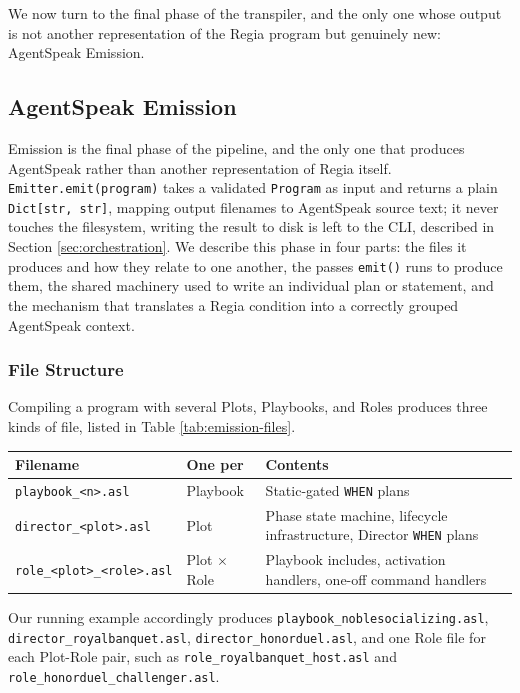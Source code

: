 We now turn to the final phase of the transpiler, and the only one whose output is not another representation of the Regia program but genuinely new: AgentSpeak Emission.

\subsection{AgentSpeak Emission}
\label{sec:emission}
Emission is the final phase of the pipeline, and the only one that produces AgentSpeak rather than another representation of Regia itself. \lstinline|Emitter.emit(program)| takes a validated \lstinline|Program| as input and returns a plain \lstinline|Dict[str, str]|, mapping output filenames to AgentSpeak source text; it never touches the filesystem, writing the result to disk is left to the CLI, described in Section \ref{sec:orchestration}. We describe this phase in four parts: the files it produces and how they relate to one another, the passes \lstinline|emit()| runs to produce them, the shared machinery used to write an individual plan or statement, and the mechanism that translates a Regia condition into a correctly grouped AgentSpeak context.

\subsubsection{File Structure}
Compiling a program with several Plots, Playbooks, and Roles produces three kinds of file, listed in Table \ref{tab:emission-files}.
\begin{center}
\begin{tabular}{|l|l|l|}
\hline
\textbf{Filename} & \textbf{One per} & \textbf{Contents} \\
\hline
\lstinline|playbook_<n>.asl| & Playbook & Static-gated \lstinline|WHEN| plans \\
\lstinline|director_<plot>.asl| & Plot & Phase state machine, lifecycle infrastructure, Director \lstinline|WHEN| plans \\
\lstinline|role_<plot>_<role>.asl| & Plot $\times$ Role & Playbook includes, activation handlers, one-off command handlers \\
\hline
\end{tabular}
\end{center}
\label{tab:emission-files}

Our running example accordingly produces \lstinline|playbook_noblesocializing.asl|, \lstinline|director_royalbanquet.asl|, \lstinline|director_honorduel.asl|, and one Role file for each Plot-Role pair, such as \lstinline|role_royalbanquet_host.asl| and \lstinline|role_honorduel_challenger.asl|.

